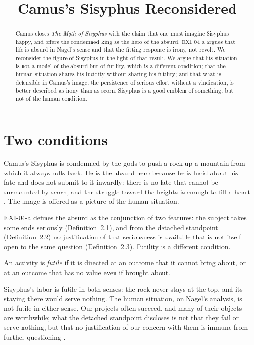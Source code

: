 \documentclass{situationist-preprint}
\title{Camus's Sisyphus Reconsidered}
\begin{document}
\maketitle

\begin{abstract}
Camus closes \emph{The Myth of Sisyphus} with the claim that one must imagine Sisyphus happy, and offers the condemned king as the hero of the absurd. EXI-04-a argues that life is absurd in Nagel's sense and that the fitting response is irony, not revolt. We reconsider the figure of Sisyphus in the light of that result. We argue that his situation is not a model of the absurd but of futility, which is a different condition; that the human situation shares his lucidity without sharing his futility; and that what is defensible in Camus's image, the persistence of serious effort without a vindication, is better described as irony than as scorn. Sisyphus is a good emblem of something, but not of the human condition.
\end{abstract}

\section{Two conditions}

Camus's Sisyphus is condemned by the gods to push a rock up a mountain from which it always rolls back. He is the absurd hero because he is lucid about his fate and does not submit to it inwardly: there is no fate that cannot be surmounted by scorn, and the struggle toward the heights is enough to fill a heart \citep{Camus1942}. The image is offered as a picture of the human situation.

EXI-04-a defines the absurd as the conjunction of two features: the subject takes some ends seriously (Definition~2.1), and from the detached standpoint (Definition~2.2) no justification of that seriousness is available that is not itself open to the same question (Definition~2.3). Futility is a different condition.

\begin{definition}\label{d:futile}
An activity is \emph{futile} if it is directed at an outcome that it cannot bring about, or at an outcome that has no value even if brought about.
\end{definition}

Sisyphus's labor is futile in both senses: the rock never stays at the top, and its staying there would serve nothing. The human situation, on Nagel's analysis, is not futile in either sense. Our projects often succeed, and many of their objects are worthwhile; what the detached standpoint discloses is not that they fail or serve nothing, but that no justification of our concern with them is immune from further questioning \citep{Nagel1971}.
\end{document}
